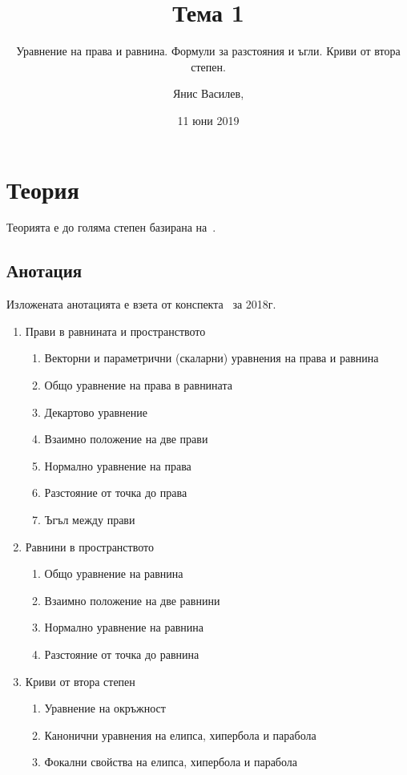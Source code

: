 \documentclass[numbers=endperiod, DIV=15, bibliography=totocnumbered]{scrartcl}
\title{Тема 1}
\subtitle{Уравнение на права и равнина. Формули за разстояния и ъгли. Криви от втора степен.}
\author{Янис Василев, \Email{ianis@ivasilev.net}}
\date{11 юни 2019}
\begin{document}
\maketitle

\section{Теория}

Теорията е до голяма степен базирана на~\cite{Notes}.

\subsection{Анотация}

Изложената анотацията е взета от конспекта~\cite{Syllabus} за 2018г.

\begin{enumerate}
  \item Прави в равнината и пространството
  \begin{enumerate}
    \item Векторни и параметрични (скаларни) уравнения на права и равнина
    \item Общо уравнение на права в равнината
    \item Декартово уравнение
    \item Взаимно положение на две прави
    \item Нормално уравнение на права
    \item Разстояние от точка до права
    \item Ъгъл между прави
  \end{enumerate}

  \item Равнини в пространството
  \begin{enumerate}
    \item Общо уравнение на равнина
    \item Взаимно положение на две равнини
    \item Нормално уравнение на равнина
    \item Разстояние от точка до равнина
  \end{enumerate}

  \item Криви от втора степен
  \begin{enumerate}
    \item Уравнение на окръжност
    \item Канонични уравнения на елипса, хипербола и парабола
    \item Фокални свойства на елипса, хипербола и парабола
  \end{enumerate}
\end{enumerate}
\end{document}
